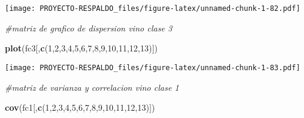 \documentclass[
]{article}
\newenvironment{Shaded}{\begin{snugshade}}{\end{snugshade}}
\newcommand{\CommentTok}[1]{\textcolor[rgb]{0.56,0.35,0.01}{\textit{#1}}}
\newcommand{\DecValTok}[1]{\textcolor[rgb]{0.00,0.00,0.81}{#1}}
\newcommand{\KeywordTok}[1]{\textcolor[rgb]{0.13,0.29,0.53}{\textbf{#1}}}
\newcommand{\NormalTok}[1]{#1}
\begin{document}
\texttt{[image: PROYECTO-RESPALDO\_files/figure-latex/unnamed-chunk-1-82.pdf]}

\begin{Shaded}
\begin{Highlighting}[]
\CommentTok{#matriz de grafico de dispersion vino clase 3}

\KeywordTok{plot}\NormalTok{(fc3[,}\KeywordTok{c}\NormalTok{(}\DecValTok{1}\NormalTok{,}\DecValTok{2}\NormalTok{,}\DecValTok{3}\NormalTok{,}\DecValTok{4}\NormalTok{,}\DecValTok{5}\NormalTok{,}\DecValTok{6}\NormalTok{,}\DecValTok{7}\NormalTok{,}\DecValTok{8}\NormalTok{,}\DecValTok{9}\NormalTok{,}\DecValTok{10}\NormalTok{,}\DecValTok{11}\NormalTok{,}\DecValTok{12}\NormalTok{,}\DecValTok{13}\NormalTok{)])}
\end{Highlighting}
\end{Shaded}

\texttt{[image: PROYECTO-RESPALDO\_files/figure-latex/unnamed-chunk-1-83.pdf]}

\begin{Shaded}
\begin{Highlighting}[]
\CommentTok{#matriz de varianza y correlacion vino clase 1}

\KeywordTok{cov}\NormalTok{(fc1[,}\KeywordTok{c}\NormalTok{(}\DecValTok{1}\NormalTok{,}\DecValTok{2}\NormalTok{,}\DecValTok{3}\NormalTok{,}\DecValTok{4}\NormalTok{,}\DecValTok{5}\NormalTok{,}\DecValTok{6}\NormalTok{,}\DecValTok{7}\NormalTok{,}\DecValTok{8}\NormalTok{,}\DecValTok{9}\NormalTok{,}\DecValTok{10}\NormalTok{,}\DecValTok{11}\NormalTok{,}\DecValTok{12}\NormalTok{,}\DecValTok{13}\NormalTok{)])}
\end{Highlighting}
\end{Shaded}
\end{document}
